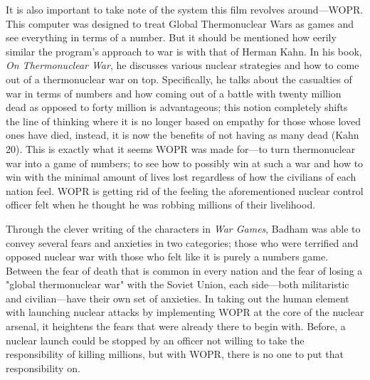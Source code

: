 \documentclass[12pt]{turabian-researchpaper}
\begin{document}
It is also important to take note of the system this film revolves around—WOPR. This computer was designed to treat Global Thermonuclear Wars as games and see everything in terms of a number. But it should be mentioned how eerily similar the program's approach to war is with that of Herman Kahn. In his book, \textit{On Thermonuclear War}, he discusses various nuclear strategies and how to come out of a thermonuclear war on top. Specifically, he talks about the casualties of war in terms of numbers and how coming out of a battle with twenty million dead as opposed to forty million is advantageous; this notion completely shifts the line of thinking where it is no longer based on empathy for those whose loved ones have died, instead, it is now the benefits of not having as many dead (Kahn 20). This is exactly what it seems WOPR was made for—to turn thermonuclear war into a game of numbers; to see how to possibly win at such a war and how to win with the minimal amount of lives lost regardless of how the civilians of each nation feel. WOPR is getting rid of the feeling the aforementioned nuclear control officer felt when he thought he was robbing millions of their livelihood.

Through the clever writing of the characters in \textit{War Games}, Badham was able to convey several fears and anxieties in two categories; those who were terrified and opposed nuclear war with those who felt like it is purely a numbers game.  Between the fear of death that is common in every nation and the fear of losing a "global thermonuclear war" with the Soviet Union, each side—both militaristic and civilian—have their own set of anxieties. In taking out the human element with launching nuclear attacks by implementing WOPR at the core of the nuclear arsenal, it heightens the fears that were already there to begin with. Before, a nuclear launch could be stopped by an officer not willing to take the responsibility of killing millions, but with WOPR, there is no one to put that responsibility on.
\end{document}
